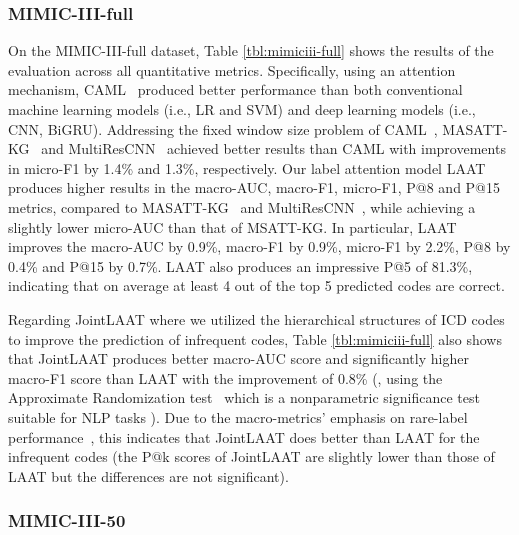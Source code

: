 \documentclass{article}
\begin{document}
\subsubsection{MIMIC-III-full} 
On the MIMIC-III-full dataset,  Table \ref{tbl:mimiciii-full} shows the results of the evaluation across all quantitative metrics. Specifically, using an attention mechanism, CAML~\cite{mullenbach2018} produced better performance than both conventional machine learning models (i.e., LR and SVM) and deep learning models (i.e., CNN, BiGRU). Addressing the fixed window size problem of CAML~\cite{mullenbach2018}, MASATT-KG~\cite{xie2019ehr} and  MultiResCNN~\cite{li2020multirescnn} achieved better results than CAML with improvements in micro-F1 by 1.4\% and 1.3\%, respectively. Our label attention model LAAT produces higher results in the macro-AUC, macro-F1, micro-F1, P@8 and P@15 metrics, compared to MASATT-KG~\cite{xie2019ehr} and MultiResCNN~\cite{li2020multirescnn}, while achieving a slightly lower micro-AUC than that of MSATT-KG. In particular,  LAAT  improves the macro-AUC by {0.9\%}, macro-F1 by 0.9\%, micro-F1 by {2.2\%}, P@8 by {0.4\%} and P@15 by {0.7\%}. LAAT  also produces an impressive P@5 of 81.3\%, indicating that on average at least 4 out of the top 5 predicted codes are correct. 

Regarding JointLAAT where we utilized the hierarchical structures of ICD codes to improve the prediction of infrequent codes, Table \ref{tbl:mimiciii-full} also shows that JointLAAT produces better macro-AUC score and significantly higher macro-F1 score than LAAT with the improvement of 0.8\% (, using the Approximate Randomization test~\cite{chinchor1992statistical} which is a nonparametric significance test suitable for NLP tasks \cite{dror2018hitchhiker}). Due to the macro-metrics' emphasis on rare-label performance~\cite{schutze2008introduction}, this indicates that JointLAAT does better than LAAT for the infrequent codes (the P@k scores of JointLAAT are slightly lower than those of LAAT but the differences are not significant).

\subsubsection{MIMIC-III-50} 
\end{document}
